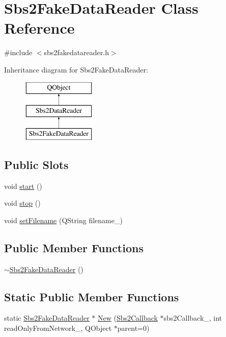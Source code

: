 \hypertarget{classSbs2FakeDataReader}{\section{Sbs2\-Fake\-Data\-Reader Class Reference}
\label{classSbs2FakeDataReader}
}


{\ttfamily \#include $<$sbs2fakedatareader.\-h$>$}

Inheritance diagram for Sbs2\-Fake\-Data\-Reader\-:\begin{figure}[H]
\begin{center}
\leavevmode
\includegraphics[height=3.000000cm]{classSbs2FakeDataReader}
\end{center}
\end{figure}
\subsection*{Public Slots}
\begin{DoxyCompactItemize}
\item 
void \hyperlink{classSbs2FakeDataReader_a89b47ade19abce4ce863ca827baf3bb8}{start} ()
\item 
void \hyperlink{classSbs2FakeDataReader_a7d83fefb103e473fcd65d93dbd0e89fd}{stop} ()
\item 
void \hyperlink{classSbs2FakeDataReader_ab9ffd9d2c27dd41a5640363841fd03a5}{set\-Filename} (Q\-String filename\-\_\-)
\end{DoxyCompactItemize}
\subsection*{Public Member Functions}
\begin{DoxyCompactItemize}
\item 
\hyperlink{classSbs2FakeDataReader_a275a5b0012846476934a3707af931c78}{$\sim$\-Sbs2\-Fake\-Data\-Reader} ()
\end{DoxyCompactItemize}
\subsection*{Static Public Member Functions}
\begin{DoxyCompactItemize}
\item 
static \hyperlink{classSbs2FakeDataReader}{Sbs2\-Fake\-Data\-Reader} $\ast$ \hyperlink{classSbs2FakeDataReader_a1321841227262ea5fc574439f99b7e75}{New} (\hyperlink{classSbs2Callback}{Sbs2\-Callback} $\ast$sbs2\-Callback\-\_\-, int read\-Only\-From\-Network\-\_, Q\-Object $\ast$parent=0)
\end{DoxyCompactItemize}
